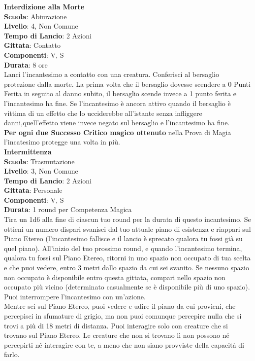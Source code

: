 \begin{multicols}{2}
\medskip\textbf{Interdizione alla Morte}\\
\textbf{Scuola}: Abiurazione\\
\textbf{Livello}: 4, Non Comune\\
\textbf{Tempo di Lancio}: 2 Azioni\\
\textbf{Gittata}: Contatto\\
\textbf{Componenti}: V, S\\
\textbf{Durata}: 8 ore\\
Lanci l'incantesimo a contatto con una creatura. Conferisci al bersaglio protezione dalla morte. La prima volta che il bersaglio dovesse scendere a 0 Punti Ferita in seguito al danno subito, il bersaglio scende invece a 1 punto ferita e l'incantesimo ha fine. Se l'incantesimo è ancora attivo quando il bersaglio è vittima di un effetto che lo ucciderebbe all'istante senza infliggere danni,quell'effetto viene invece negato sul bersaglio e l'incantesimo ha fine.\\
\textbf{Per ogni due Successo Critico magico ottenuto} nella Prova di Magia l'incatesimo protegge una volta in più.\\

\medskip\textbf{Intermittenza}\\
\textbf{Scuola}: Trasmutazione\\
\textbf{Livello}: 3, Non Comune\\
\textbf{Tempo di Lancio}: 2 Azioni\\
\textbf{Gittata}: Personale\\
\textbf{Componenti}: V, S\\
\textbf{Durata}: 1 round per Competenza Magica\\
Tira un 1d6 alla fine di ciascun tuo round per la durata di questo incantesimo. Se ottieni un numero dispari svanisci dal tuo attuale piano di esistenza e riappari sul Piano Etereo (l'incantesimo fallisce e il lancio è sprecato qualora tu fossi già su quel piano). All'inizio del tuo prossimo round, e quando l'incantesimo termina, qualora tu fossi sul Piano Etereo, ritorni in uno spazio non occupato di tua scelta e che puoi vedere, entro 3 metri dallo spazio da cui sei svanito. Se nessuno spazio non occupato è disponibile entro questa gittata, compari nello spazio non occupato più vicino (determinato casualmente se è disponibile più di uno spazio). Puoi interrompere l'incantesimo con un'azione.\\
Mentre sei sul Piano Etereo, puoi vedere e udire il piano da cui provieni, che percepisci in sfumature di grigio, ma non puoi comunque percepire nulla che si trovi a più di 18 metri di distanza. Puoi interagire solo con creature che si trovano sul Piano Etereo. Le creature che non si trovano lì non possono né percepirti né interagire con te, a meno che non siano provviste della capacità di farlo.


\end{multicols}
